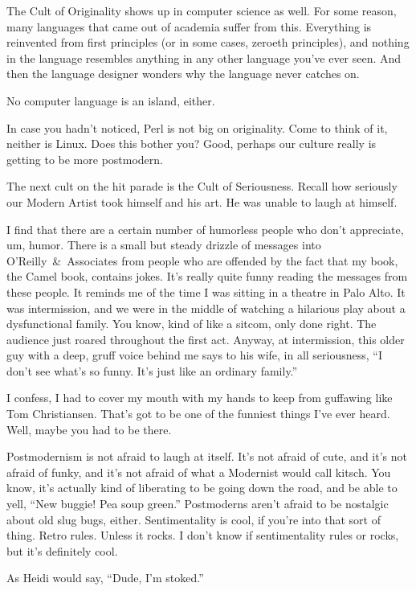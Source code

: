 \documentclass[10pt,letterpaper]{article}
\begin{document}
The Cult of Originality shows up in computer science as well. For some
reason, many languages that came out of academia suffer from this. Everything
is reinvented from first principles (or in some cases, zeroeth principles),
and nothing in the language resembles anything in any other language you've
ever seen. And then the language designer wonders why the language never
catches on.

No computer language is an island, either.

In case you hadn't noticed, Perl is not big on originality. Come to think of
it, neither is Linux. Does this bother you? Good, perhaps our culture really
is getting to be more postmodern.

The next cult on the hit parade is the Cult of Seriousness. Recall how
seriously our Modern Artist took himself and his art. He was unable to laugh
at himself.

I find that there are a certain number of humorless people who don't
appreciate, um, humor. There is a small but steady drizzle of messages into
O'Reilly~\&~Associates from people who are offended by the fact that my book,
the Camel book, contains jokes. It's really quite funny reading the messages
from these people. It reminds me of the time I was sitting in a theatre in
Palo Alto. It was intermission, and we were in the middle of watching a
hilarious play about a dysfunctional family. You know, kind of like a sitcom,
only done right. The audience just roared throughout the first act. Anyway,
at intermission, this older guy with a deep, gruff voice behind me says to
his wife, in all seriousness, ``I don't see what's so funny. It's just like
an ordinary family.''

I confess, I had to cover my mouth with my hands to keep from guffawing like
Tom Christiansen. That's got to be one of the funniest things I've ever
heard. Well, maybe you had to be there.

Postmodernism is not afraid to laugh at itself. It's not afraid of cute, and
it's not afraid of funky, and it's not afraid of what a Modernist would call
kitsch. You know, it's actually kind of liberating to be going down the road,
and be able to yell, ``New buggie! Pea soup green.'' Postmoderns aren't
afraid to be nostalgic about old slug bugs, either. Sentimentality is cool,
if you're into that sort of thing. Retro rules. Unless it rocks. I don't know
if sentimentality rules or rocks, but it's definitely cool.

As Heidi would say, ``Dude, I'm stoked.''
\end{document}
